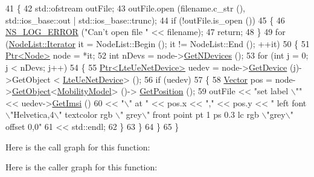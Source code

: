 \begin{DoxyCode}
41 \{
42   std::ofstream outFile;
43   outFile.open (filename.c\_str (), std::ios\_base::out | std::ios\_base::trunc);
44   \textcolor{keywordflow}{if} (!outFile.is\_open ())
45     \{
46       \hyperlink{group__logging_ga0261a8db1d4ac5f79417d117634fd455}{NS\_LOG\_ERROR} (\textcolor{stringliteral}{"Can't open file "} << filename);
47       \textcolor{keywordflow}{return};
48     \}
49   \textcolor{keywordflow}{for} (\hyperlink{classns3_1_1NodeList_a9e2679a94efb4f0066cc21e65440364d}{NodeList::Iterator} it = NodeList::Begin (); it != NodeList::End (); ++it)
50     \{
51       \hyperlink{classns3_1_1Ptr}{Ptr<Node>} node = *it;
52       \textcolor{keywordtype}{int} nDevs = node->\hyperlink{classns3_1_1Node_a531554d2241ba4fa1cd74e3360be6bce}{GetNDevices} ();
53       \textcolor{keywordflow}{for} (\textcolor{keywordtype}{int} j = 0; j < nDevs; j++)
54         \{
55           \hyperlink{classns3_1_1Ptr}{Ptr<LteUeNetDevice>} uedev = node->\hyperlink{classns3_1_1Node_a5918dfd24ef632efc9a83a5f6561c76e}{GetDevice} (j)->GetObject <
      \hyperlink{classns3_1_1LteUeNetDevice}{LteUeNetDevice}> ();
56           \textcolor{keywordflow}{if} (uedev)
57             \{
58               \hyperlink{classns3_1_1Vector3D_a7e59b47bc94c9cb1dadff68c1d0112d8}{Vector} pos = node->\hyperlink{classns3_1_1Object_a13e18c00017096c8381eb651d5bd0783}{GetObject}<\hyperlink{classns3_1_1MobilityModel}{MobilityModel}> ()->
      \hyperlink{lena-cqi-threshold_8cc_acebf763e1a0478cec225f9547941ae54}{GetPosition} ();
59               outFile << \textcolor{stringliteral}{"set label \(\backslash\)""} << uedev->\hyperlink{classns3_1_1LteUeNetDevice_a673405bfed4b45c5714f17b0c3bad334}{GetImsi} ()
60                       << \textcolor{stringliteral}{"\(\backslash\)" at "} << pos.x << \textcolor{stringliteral}{","} << pos.y << \textcolor{stringliteral}{" left font \(\backslash\)"Helvetica,4\(\backslash\)" textcolor rgb \(\backslash\)"
      grey\(\backslash\)" front point pt 1 ps 0.3 lc rgb \(\backslash\)"grey\(\backslash\)" offset 0,0"}
61                       << std::endl;
62             \}
63         \}
64     \}
65 \}
\end{DoxyCode}


Here is the call graph for this function\+:




Here is the caller graph for this function\+:


